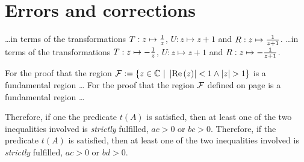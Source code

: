 \chapter{Errors and corrections}

\begin{description}
{\dots in terms of the transformations $T : z \mapsto \frac{1}{z}$, $U : z \mapsto z+1$ and $R : z \mapsto \frac{1}{z+1}$.}
{\dots in terms of the transformations $T : z \mapsto -\frac{1}{z}$, $U : z \mapsto z+1$ and $R : z \mapsto -\frac{1}{z+1}$.}

{For the proof that the region $\mathcal{F} := \{ z \in \mathbb{C} \ | \ \left|\operatorname{Re}\left(z\right)\right| < 1 \land \left|z\right| > 1 \}$ is a fundamental region \dots}
{For the proof that the region $\mathcal{F}$ defined on page \pageref{eqn_PSL2FunDom} is a fundamental region \dots}

{Therefore, if one the predicate $t(A)$ is satisfied, then at least one of the two inequalities involved is \emph{strictly} fulfilled, \ie $ac > 0$ or $bc > 0$.}
{Therefore, if the predicate $t(A)$ is satisfied, then at least one of the two inequalities involved is \emph{strictly} fulfilled, \ie $ac > 0$ or $bd > 0$.}
\end{description}
